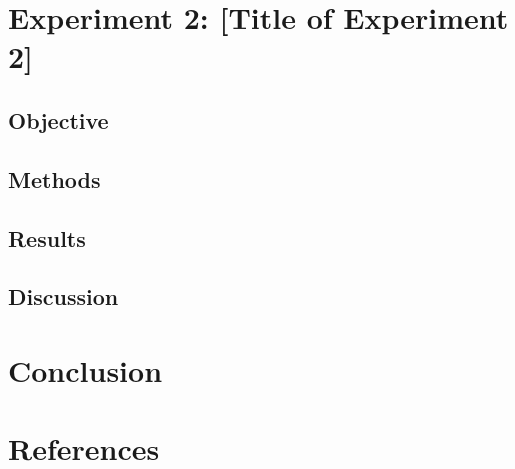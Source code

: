 
\section{Experiment 2: [Title of Experiment 2]}
\subsection{Objective}

\subsection{Methods}

\subsection{Results}

\subsection{Discussion}

\section{Conclusion}

\section{References}
